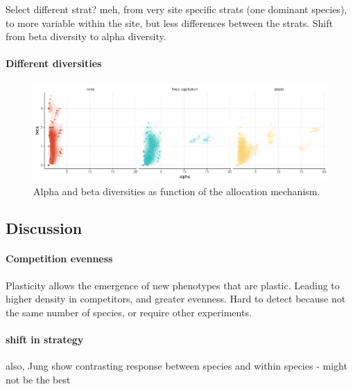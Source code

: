 Select different strat? meh, from very site specific strats (one dominant species), to more variable within the site, but less differences between the strats. Shift from beta diversity to alpha diversity.



\paragraph{Different diversities}


\begin{figure}\label{fig:diversities}
\includegraphics[]{./2_PP/Figures/Comm/comm_div_differences_alpha_beta.pdf}
\caption[Alpha and beta diversities as function of the allocation mechanism.]{Alpha and beta diversities as function of the allocation mechanism.}
\end{figure}

\subsection{Discussion}
\paragraph{Competition evenness}

Plasticity allows the emergence of new phenotypes that are plastic. Leading to higher density in competitors, and greater evenness. Hard to detect because not the same number of species, or require other experiments. 

\paragraph{shift in strategy}


also, Jung \cite{jung_intraspecific_2014} show contrasting response between species and within species - might not be the best 

